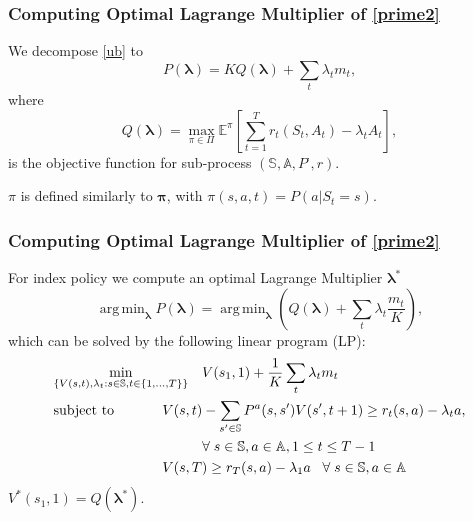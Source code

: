 \documentclass{beamer}
\DeclareMathOperator*{\argmin}{arg\,min}
\newcommand{\lambdav}{\pmb{\lambda}}
\newcommand{\allp}{\pmb{\pi}}
\newcommand{\subp}{\pi}
\newcommand{\subpset}{\Pi}
\newcommand{\subr}{r}
\newcommand{\substates}{\mathbb{S}}
\newcommand{\substater}{S}
\newcommand{\substate}{s}
\newcommand{\subactions}{\mathbb{A}}
\newcommand{\subar}{A}
\newcommand{\subpr}{P}
\newcommand{\subaction}{a}
\begin{document}
\begin{frame}[plain]
\frametitle{Computing Optimal Lagrange Multiplier of \eqref{prime2}}
We decompose \eqref{ub} to
\begin{equation}\label{dec}
P(\lambdav)=K Q(\lambdav) + \sum_t\lambda_t m_t,
\end{equation}
where
\begin{equation}\label{dpx}
Q(\lambdav)=\max_{\subp\in \subpset}\mathbb{E}^{\subp}\left[\sum_{t=1}^{T}\subr_t(\substater_t,\subar_t)-\lambda_t \subar_t\right],
\end{equation}
is the objective function for sub-process $(\substates,\subactions,\subpr^{\cdot},\subr)$. 

$\subp$ is defined similarly to $\allp$, with  $\subp(\substate,\subaction,t) = P(\subaction|\substater_t=\substate)$.

\end{frame}

\begin{frame}[plain]
\frametitle{Computing Optimal Lagrange Multiplier of \eqref{prime2}}
For index policy we compute an optimal Lagrange Multiplier $\lambdav^*$
\begin{equation}\label{eq:dual}
\argmin_{\lambdav} P(\lambdav) = \argmin_{\lambdav}\left(Q(\lambdav)+\sum_t\lambda_t\frac{m_t}{K}\right),
\end{equation}
which can be solved by the following linear program (LP):
\small
\begin{equation}\label{LP-p}
\begin{aligned}
& \underset{\{V(s,t),\lambda_t:s\in\substates,t\in\{1,...,T\}\}}{\text{min}}
& & V(s_1,1)+\frac{1}{K}\sum_t \lambda_t m_t \\
& \text{subject to}
& & \hspace{-1cm}V(s,t)-\sum_{s'\in\substates}P^a(s,s')V(s',t+1)\geq r_t(s,a)-\lambda_ta, \\
& & &\forall\; s\in\substates,a\in\subactions,1\leq t\leq T-1\\
& & &\hspace{-1cm} V(s,T)\geq r_T(s,a)-\lambda_1a\;\;\;\forall\;s\in\substates,a\in\subactions
\end{aligned}
\end{equation}
\normalsize
$V^*(s_1,1)=Q(\lambdav^*)$.
\end{frame}
\end{document}
